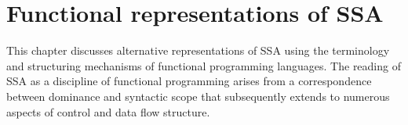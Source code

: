 \chapter{Functional representations of SSA }
{}
\graphicspath{{img/}{semantics/img/}{part1/semantics/img/}}

\newcommand{\pdec}[3]{\ensuremath{\texttt{proc}\ } {#1}\ \texttt{(}{#2}\texttt{)\ =} \ {#3}}
\newcommand{\letin}[3]{\ensuremath{\texttt{let}\ {#1}\ \texttt{=}\ {#2}\ 
                       \texttt{in}\ {#3}\ \texttt{end}}}
\newcommand{\letinD}[3]{\ensuremath{\texttt{let}\ {#1}\ \texttt{=}\ {#2}\ 
                       \texttt{in}\ {#3}\ }}
\newcommand{\ite}[3]{\ensuremath{\texttt{if}\ {#1}\ \texttt{then}\ {#2}\
                        \texttt{else}\ {#3}}}
\newcommand{\letrec}[2]{\ensuremath{\texttt{fun}\ {#1}\ \texttt{in}\ {#2}\ \texttt{end}}}
\newcommand{\call}[2]{\ensuremath{{#1}\texttt{(}{#2}\texttt{)}}}
\newcommand{\decl}[0]{\ensuremath{\textit{decl}}}
\newcommand{\uopsymbol}[0]{\ensuremath{\textit{unop}}}
\newcommand{\bopsymbol}[0]{\ensuremath{\textit{binop}}}
\newcommand{\uop}[1]{\ensuremath{\uopsymbol\ {#1}}}
\newcommand{\bop}[2]{\ensuremath{\bopsymbol\ {#1}\ {#2}}}
\newcommand{\simplejudge}[2]{{#1} \vdash {#2}}
\newcommand{\closenode}[3]{\texttt{close}_{{#1}}({#2},{#3})}
\newcommand{\loopnode}[3]{\texttt{loop}_{{#1}}({#2},{#3})}
\newcommand{\LV}{\ensuremath{\sc{Live}}}
\newcommand{\fv}{\ensuremath{\sc{Free}}}



\label{section:Part1:Semantics:Intro}
This chapter discusses alternative representations of SSA using the
terminology and structuring mechanisms of functional programming
languages. The reading of SSA as a discipline of functional
programming arises from a correspondence between dominance and
syntactic scope that subsequently extends to numerous aspects of
control and data flow structure.

